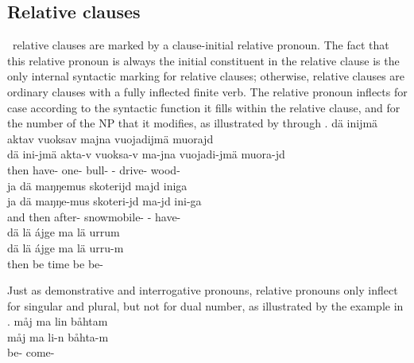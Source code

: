 \subsection{Relative clauses}\label{relativeClauses}
\PS\ relative clauses are marked by a clause-initial relative pronoun. The fact that this relative pronoun  
is always the initial constituent in the relative clause is the only internal syntactic marking for relative clauses; otherwise, relative clauses are ordinary clauses with a fully inflected finite verb. %
The relative pronoun %
inflects for case according to the syntactic function it fills within the relative clause, and for the number of the NP that it modifies, as illustrated by  through .
\ea\label{relClause1}%
\glll	dä inijmä aktav vuoksav majna vuojadijmä muorajd\\
	dä ini-jmä akta-v vuoksa-v ma-jna vuojadi-jmä muora-jd\\
	then have- one- bull- - drive- wood-\\\nopagebreak
{} 
\z
\ea\label{relClause2}%
\glll	ja dä maŋŋemus skoterijd majd iniga\\
	ja dä maŋŋe-mus skoteri-jd ma-jd ini-ga\\
	and then after- snowmobile- - have-\\\nopagebreak
{} 
\z
\ea\label{relClause3}%
\glll	dä lä ájge ma lä urrum\\
	dä lä ájge ma lä urru-m \\
	then be\BS{} time\BS{} \BS{} be\BS{} be-\\\nopagebreak
{} 
\z

Just as demonstrative and interrogative pronouns, relative pronouns only inflect for singular and plural, but not for dual number, as illustrated by the example in . 
\ea\label{relClause4}%
\glll	måj ma lin båhtam\\
	måj ma li-n båhta-m\\
	 \BS{} be- come-\\\nopagebreak
{} 
\z

